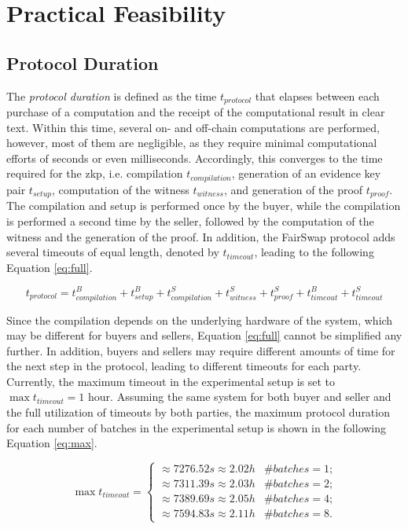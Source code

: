 \section{Practical Feasibility}

\subsection{Protocol Duration}
\label{subsec:duration}

The \emph{protocol duration} is defined as the time $t_{protocol}$ that elapses between each purchase of a computation and the receipt of the computational result in clear text. Within this time, several on- and off-chain computations are performed, however, most of them are negligible, as they require minimal computational efforts of seconds or even milliseconds. Accordingly, this converges to the time required for the \acrshort{zkp}, i.e. compilation $t_{compilation}$, generation of an evidence key pair $t_{setup}$, computation of the witness $t_{witness}$, and generation of the proof $t_{proof}$. The compilation and setup is performed once by the buyer, while the compilation is performed a second time by the seller, followed by the computation of the witness and the generation of the proof. In addition, the FairSwap protocol adds several timeouts of equal length, denoted by $t_{timeout}$, leading to the following Equation \ref{eq:full}.

\begin{equation}\label{eq:full}
t_{protocol} = t^{B}_{compilation} + t^{B}_{setup} + t^{S}_{compilation} + t^{S}_{witness} + t^{S}_{proof} + t^{B}_{timeout} + t^{S}_{timeout}
\end{equation}

Since the compilation depends on the underlying hardware of the system, which may be different for buyers and sellers, Equation \ref{eq:full} cannot be simplified any further. In addition, buyers and sellers may require different amounts of time for the next step in the protocol, leading to different timeouts for each party. Currently, the maximum timeout in the experimental setup is set to $\max{t_{timeout}} = 1$ hour. Assuming the same system for both buyer and seller and the full utilization of timeouts by both parties, the maximum protocol duration for each number of batches in the experimental setup is shown in the following Equation \ref{eq:max}.

\begin{equation}\label{eq:max}
\max{t_{timeout}} = \begin{cases}
\approx 7276.52s \approx 2.02h & \text{$\# batches = 1$;}\\
\approx 7311.39s \approx 2.03h & \text{$\# batches = 2$;}\\
\approx 7389.69s \approx 2.05h & \text{$\# batches = 4$;}\\
\approx 7594.83s \approx 2.11h & \text{$\# batches = 8$.}
\end{cases}
\end{equation}

